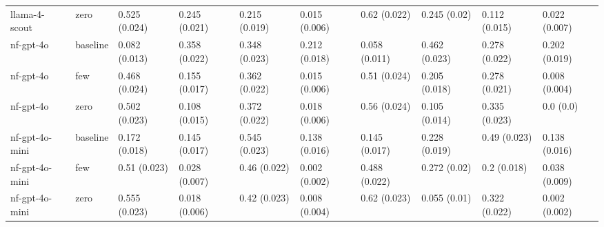 \begin{table}[htbp]
\begin{tabular}{llllllllll}
llama-4-scout & zero & 0.525 (0.024) & 0.245 (0.021) & 0.215 (0.019) & 0.015 (0.006) & 0.62 (0.022) & 0.245 (0.02) & 0.112 (0.015) & 0.022 (0.007) \\
nf-gpt-4o & baseline & 0.082 (0.013) & 0.358 (0.022) & 0.348 (0.023) & 0.212 (0.018) & 0.058 (0.011) & 0.462 (0.023) & 0.278 (0.022) & 0.202 (0.019) \\
nf-gpt-4o & few & 0.468 (0.024) & 0.155 (0.017) & 0.362 (0.022) & 0.015 (0.006) & 0.51 (0.024) & 0.205 (0.018) & 0.278 (0.021) & 0.008 (0.004) \\
nf-gpt-4o & zero & 0.502 (0.023) & 0.108 (0.015) & 0.372 (0.022) & 0.018 (0.006) & 0.56 (0.024) & 0.105 (0.014) & 0.335 (0.023) & 0.0 (0.0) \\
nf-gpt-4o-mini & baseline & 0.172 (0.018) & 0.145 (0.017) & 0.545 (0.023) & 0.138 (0.016) & 0.145 (0.017) & 0.228 (0.019) & 0.49 (0.023) & 0.138 (0.016) \\
nf-gpt-4o-mini & few & 0.51 (0.023) & 0.028 (0.007) & 0.46 (0.022) & 0.002 (0.002) & 0.488 (0.022) & 0.272 (0.02) & 0.2 (0.018) & 0.038 (0.009) \\
nf-gpt-4o-mini & zero & 0.555 (0.023) & 0.018 (0.006) & 0.42 (0.023) & 0.008 (0.004) & 0.62 (0.023) & 0.055 (0.01) & 0.322 (0.022) & 0.002 (0.002) \\
\bottomrule
\end{tabular}
\end{table}

